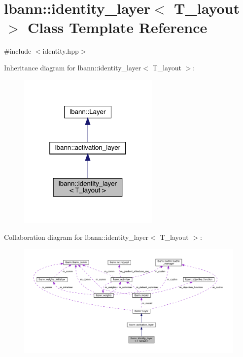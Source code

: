 \hypertarget{classlbann_1_1identity__layer}{}\section{lbann\+:\+:identity\+\_\+layer$<$ T\+\_\+layout $>$ Class Template Reference}
\label{classlbann_1_1identity__layer}


{\ttfamily \#include $<$identity.\+hpp$>$}



Inheritance diagram for lbann\+:\+:identity\+\_\+layer$<$ T\+\_\+layout $>$\+:\nopagebreak
\begin{figure}[H]
\begin{center}
\leavevmode
\includegraphics[width=196pt]{classlbann_1_1identity__layer__inherit__graph}
\end{center}
\end{figure}


Collaboration diagram for lbann\+:\+:identity\+\_\+layer$<$ T\+\_\+layout $>$\+:\nopagebreak
\begin{figure}[H]
\begin{center}
\leavevmode
\includegraphics[width=350pt]{classlbann_1_1identity__layer__coll__graph}
\end{center}
\end{figure}
